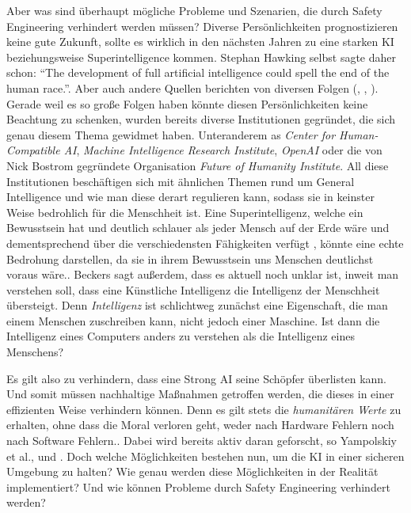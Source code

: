         Aber was sind überhaupt mögliche Probleme und Szenarien, die durch Safety Engineering verhindert werden müssen?
        Diverse Persönlichkeiten prognostizieren keine gute Zukunft, sollte es wirklich in den nächsten Jahren zu
        eine starken KI beziehungsweise Superintelligence kommen. Stephan Hawking selbst sagte daher schon: ``The development
        of full artificial intelligence could spell the end of the human race.''.\cite{cellan-jones_2014} Aber auch
        andere Quellen berichten von diversen Folgen (\cite[Bostrom]{bostrom_2014}, \cite[Beckers]{Beckers2018},
        \cite[Musk]{hern_2015}). Gerade weil es so große Folgen haben könnte diesen Persönlichkeiten keine Beachtung zu
        schenken, wurden bereits diverse Institutionen gegründet, die sich genau diesem Thema gewidmet haben. Unteranderem
        as \textit{Center for Human-Compatible AI}, \textit{Machine Intelligence Research Institute}, \textit{OpenAI} oder
        die von Nick Bostrom gegründete Organisation \textit{Future of Humanity Institute}. All diese Institutionen
        beschäftigen sich mit ähnlichen Themen rund um General Intelligence und wie man diese derart regulieren kann,
        sodass sie in keinster Weise bedrohlich für die Menschheit ist. Eine Superintelligenz, welche ein Bewusstsein hat
        und deutlich schlauer als jeder Mensch auf der Erde wäre und dementsprechend über die verschiedensten Fähigkeiten
        verfügt \cite{bostrom_2006}, könnte eine echte Bedrohung darstellen, da sie in ihrem Bewusstsein uns Menschen
        deutlichst voraus wäre.\cite{Beckers2018}. Beckers sagt außerdem, dass es aktuell noch unklar ist, inweit man
        verstehen soll, dass eine Künstliche Intelligenz die Intelligenz der Menschheit übersteigt.\cite[p. 237]{Beckers2018}
        Denn \textit{Intelligenz} ist schlichtweg zunächst eine Eigenschaft, die man einem Menschen zuschreiben kann,
        nicht jedoch einer Maschine. Ist dann die Intelligenz eines Computers anders zu verstehen als die Intelligenz
        eines Menschens?

        Es gilt also zu verhindern, dass eine Strong AI seine Schöpfer überlisten kann. Und somit müssen nachhaltige
        Maßnahmen getroffen werden, die dieses in einer effizienten Weise verhindern können. Denn es gilt stets die
        \textit{humanitären Werte} zu erhalten, ohne dass die Moral verloren geht, weder nach Hardware Fehlern noch
        nach Software Fehlern.\cite[p. 7]{yampolskiy2013safety}. Dabei wird bereits aktiv daran geforscht, so
        Yampolskiy et al.\citep{gordon1998}, \citep{GordonSpears2003} und \citep{Spears}. Doch welche Möglichkeiten
        bestehen nun, um die KI in einer sicheren Umgebung zu halten? Wie genau werden diese Möglichkeiten in der
        Realität implementiert? Und wie können Probleme durch Safety Engineering verhindert werden?


